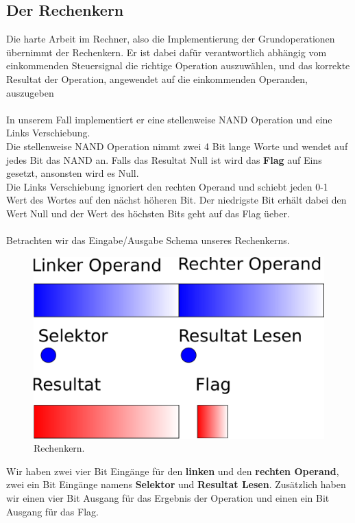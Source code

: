 \documentclass[11pt,a4paper,leqno]{report}
\numberwithin{equation}{chapter}
\begin{document}
\subsection{Der Rechenkern}
Die harte Arbeit im Rechner, also die Implementierung der Grundoperationen \"ubernimmt der Rechenkern. Er ist dabei daf\"ur verantwortlich abh\"angig vom einkommenden Steuersignal die richtige Operation auszuw\"ahlen, und das korrekte Resultat der Operation, angewendet auf die einkommenden Operanden, auszugeben\\
\\
In unserem Fall implementiert er eine stellenweise NAND Operation und eine Links Verschiebung.\\
Die stellenweise NAND Operation nimmt zwei 4 Bit lange Worte und wendet auf jedes Bit das NAND an. Falls das Resultat Null ist wird das \textbf{Flag} auf Eins gesetzt, ansonsten wird es Null.\\
Die Links Verschiebung ignoriert den rechten Operand und schiebt jeden 0-1 Wert des Wortes auf den n\"achst h\"oheren Bit. Der niedrigste Bit erh\"alt dabei den Wert Null und der Wert des h\"ochsten Bits geht auf das Flag \"ueber.\\
\\
Betrachten wir das Eingabe/Ausgabe Schema unseres Rechenkerns.
\begin{figure}[H]
	\begin{center}
		\includegraphics[scale=0.3]{ALU.pdf}
		\caption{Rechenkern.}
	\end{center}
\end{figure}
\noindent
Wir haben zwei vier Bit Eing\"ange f\"ur den \textbf{linken} und den \textbf{rechten Operand}, zwei ein Bit Eing\"ange namens \textbf{Selektor} und \textbf{Resultat Lesen}. Zus\"atzlich haben wir einen vier Bit Ausgang f\"ur das Ergebnis der Operation und einen ein Bit Ausgang f\"ur das Flag.\\
\end{document}
